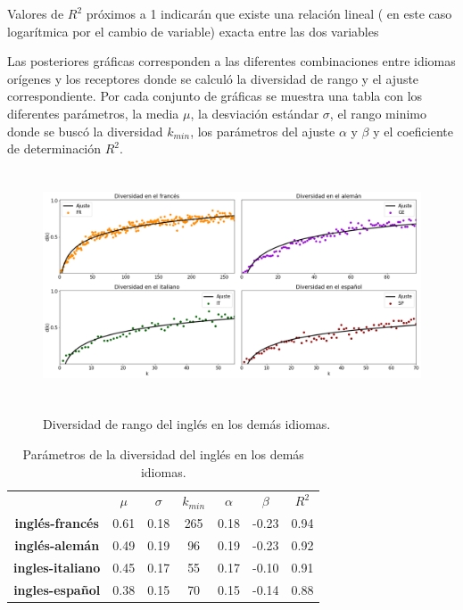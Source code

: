 Valores de $R^{2}$ próximos a 1 indicarán que existe una relación lineal ( en este caso logarítmica por el cambio de variable) exacta entre las dos variables

Las posteriores gráficas corresponden a las diferentes combinaciones entre idiomas orígenes y los receptores donde se calculó la diversidad de rango y el ajuste correspondiente.  Por cada conjunto de gráficas se muestra una tabla con los diferentes parámetros, la media $\mu$, la desviación estándar $\sigma$, el rango minimo donde se buscó la diversidad $k_{min}$, los parámetros del ajuste $\alpha$ y $\beta$  y el coeficiente de determinación $R^{2}$.
 
\newpage

\begin{figure}[h!]
	\centering
	\includegraphics[width=15cm, height=6.8cm]{Cap_6/DR_EN.png}
	\label{fig.DR_EN}
	\caption{Diversidad de rango del inglés en los demás idiomas.}
\end{figure}


\begin{table}[h!]
	\centering
	\begin{tabular}{ccccccc}
		\textbf{}                & \textbf{$\mu$} & \textbf{$\sigma$} & \textbf{$k_{min}$} & \textbf{$\alpha$} & \textbf{$\beta$} & \textbf{$R^{2}$} \\
		\textbf{inglés-francés}  & 0.61           & 0.18                & 265                   & 0.18           & -0.23         & 0.94        \\
		\textbf{inglés-alemán}   & 0.49           & 0.19                & 96                    & 0.19           & -0.23         & 0.92        \\
		\textbf{ingles-italiano} & 0.45           & 0.17                & 55                    & 0.17           & -0.10         & 0.91        \\
		\textbf{ingles-español}  & 0.38           & 0.15                & 70                    & 0.15           & -0.14         & 0.88       
	\end{tabular}
	\caption{Parámetros de la diversidad del inglés en los demás idiomas.}
	\label{tab.DR_EN}
\end{table}



